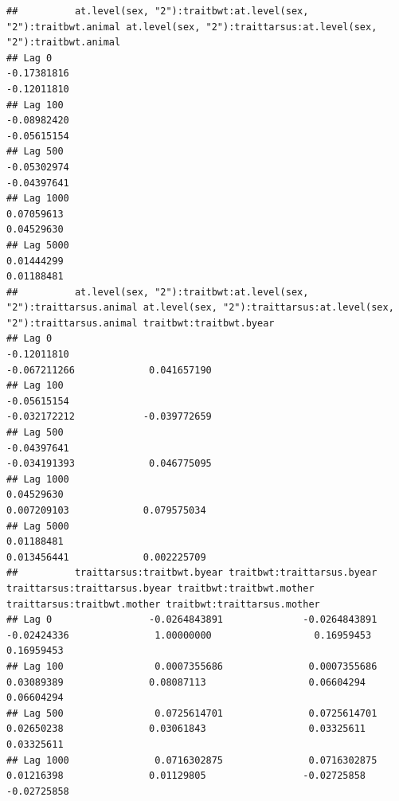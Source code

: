 \documentclass[
  12pt,
]{book}
\begin{document}
\begin{verbatim}
##          at.level(sex, "2"):traitbwt:at.level(sex, "2"):traitbwt.animal at.level(sex, "2"):traittarsus:at.level(sex, "2"):traitbwt.animal
## Lag 0                                                       -0.17381816                                                       -0.12011810
## Lag 100                                                     -0.08982420                                                       -0.05615154
## Lag 500                                                     -0.05302974                                                       -0.04397641
## Lag 1000                                                     0.07059613                                                        0.04529630
## Lag 5000                                                     0.01444299                                                        0.01188481
##          at.level(sex, "2"):traitbwt:at.level(sex, "2"):traittarsus.animal at.level(sex, "2"):traittarsus:at.level(sex, "2"):traittarsus.animal traitbwt:traitbwt.byear
## Lag 0                                                          -0.12011810                                                         -0.067211266             0.041657190
## Lag 100                                                        -0.05615154                                                         -0.032172212            -0.039772659
## Lag 500                                                        -0.04397641                                                         -0.034191393             0.046775095
## Lag 1000                                                        0.04529630                                                          0.007209103             0.079575034
## Lag 5000                                                        0.01188481                                                          0.013456441             0.002225709
##          traittarsus:traitbwt.byear traitbwt:traittarsus.byear traittarsus:traittarsus.byear traitbwt:traitbwt.mother traittarsus:traitbwt.mother traitbwt:traittarsus.mother
## Lag 0                 -0.0264843891              -0.0264843891                   -0.02424336               1.00000000                  0.16959453                  0.16959453
## Lag 100                0.0007355686               0.0007355686                    0.03089389               0.08087113                  0.06604294                  0.06604294
## Lag 500                0.0725614701               0.0725614701                    0.02650238               0.03061843                  0.03325611                  0.03325611
## Lag 1000               0.0716302875               0.0716302875                    0.01216398               0.01129805                 -0.02725858                 -0.02725858

\end{verbatim}
\end{document}
